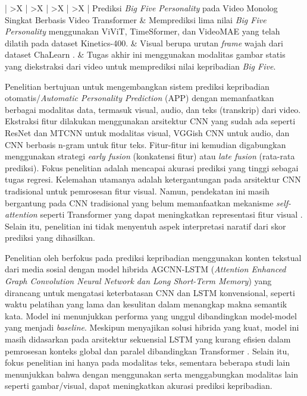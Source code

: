 {\begin{xltabular}{\textwidth}{|
			>{\hsize}X |
			>{\hsize}X |
			>{\hsize}X |
			>{\hsize}X | }
		Prediksi \textit{Big Five Personality} pada Video Monolog Singkat Berbasis Video Transformer \parencite{Adyuta2026} & Memprediksi lima nilai \textit{Big Five Personality} menggunakan ViViT, TimeSformer, dan VideoMAE yang telah dilatih pada dataset Kinetics-400. &  Visual berupa urutan \textit{frame} wajah dari dataset ChaLearn \parencite{Ponce-Lpez2016}. & Tugas akhir ini menggunakan modalitas gambar statis yang diekstraksi dari video untuk memprediksi nilai kepribadian \textit{Big Five}. \\ \hline	

	\end{xltabular}
} %


Penelitian \textcite{Suman2022} bertujuan untuk mengembangkan sistem prediksi kepribadian otomatis/\textit{Automatic Personality Prediction} (APP) dengan memanfaatkan berbagai modalitas data, termasuk visual, audio, dan teks (transkrip) dari video. Ekstraksi fitur dilakukan menggunakan arsitektur CNN yang sudah ada seperti ResNet dan MTCNN untuk modalitas visual, VGGish CNN untuk audio, dan CNN berbasis n-gram untuk fitur teks. Fitur-fitur ini kemudian digabungkan menggunakan strategi \textit{early fusion} (konkatensi fitur) atau \textit{late fusion} (rata-rata prediksi). Fokus penelitian adalah mencapai akurasi prediksi yang tinggi sebagai tugas regresi. Kelemahan utamanya adalah ketergantungan pada arsitektur CNN tradisional untuk pemrosesan fitur visual. Namun, pendekatan ini masih bergantung pada CNN tradisional yang belum memanfaatkan mekanisme \textit{self-attention} seperti Transformer yang dapat meningkatkan representasi fitur visual \parencite{El-Demerdash2022}. Selain itu, penelitian ini tidak menyentuh aspek interpretasi naratif dari skor prediksi yang dihasilkan.

Penelitian oleh \textcite{Sharma2023} berfokus pada prediksi kepribadian menggunakan konten tekstual dari media sosial dengan model hibrida AGCNN-LSTM (\textit{Attention Enhanced Graph Convolution Neural Network dan Long Short-Term Memory}) yang dirancang untuk mengatasi keterbatasan CNN dan LSTM konvensional, seperti waktu pelatihan yang lama dan kesulitan dalam menangkap makna semantik kata. Model ini menunjukkan performa yang unggul dibandingkan model-model yang menjadi \textit{baseline}. Meskipun menyajikan solusi hibrida yang kuat, model ini masih didasarkan pada arsitektur sekuensial LSTM yang kurang efisien dalam pemrosesan konteks global dan paralel dibandingkan Transformer \parencite{Prasad2024}. Selain itu, fokus penelitian ini hanya pada modalitas teks, sementara beberapa studi lain menunjukkan bahwa dengan menggunakan serta menggabungkan modalitas lain seperti gambar/visual, dapat meningkatkan akurasi prediksi kepribadian.

